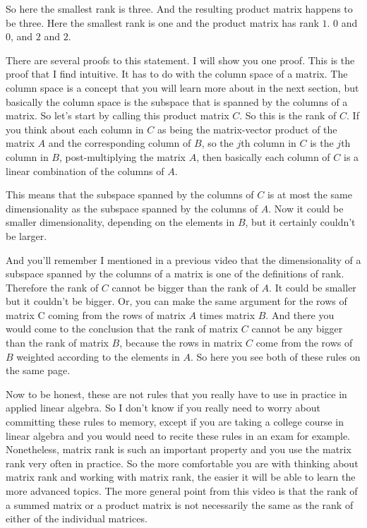 \documentclass[fleqn,10pt]{olplainarticle}
\theoremstyle{definition}
\theoremstyle{remark}
\begin{document}
So here the smallest rank is three. And the resulting product matrix happens to be three. Here the smallest rank is one and the product matrix has rank $1$. $0$ and $0$, and $2$ and $2$.

There are several proofs to this statement. I will show you one proof. This is the proof that I find intuitive. It has to do with the column space of a matrix. The column space is a concept that you will learn more about in the next section, but basically the column space is the subspace that is spanned by the columns of a matrix. So let's start by calling this product matrix $C$. So this is the rank of $C$. If you think about each column in $C$ as being the matrix-vector product of the matrix $A$ and the corresponding column of $B$, so the $j$th column in $C$ is the $j$th column in $B$, post-multiplying the matrix $A$, then basically each column of $C$ is a linear combination of the columns of $A$.

This means that the subspace spanned by the columns of $C$ is at most the same dimensionality as the subspace spanned by the columns of $A$. Now it could be smaller dimensionality, depending on the elements in $B$, but it certainly couldn't be larger.

And you'll remember I mentioned in a previous video that the dimensionality of a subspace spanned by the columns of a matrix is one of the definitions of rank. Therefore the rank of $C$ cannot be bigger than the rank of $A$. It could be smaller but it couldn't be bigger. Or, you can make the same argument for the rows of matrix C coming from the rows of matrix $A$ times matrix $B$. And there you would come to the conclusion that the rank of matrix $C$ cannot be any bigger than the rank of matrix $B$, because the rows in matrix $C$ come from the rows of $B$ weighted according to the elements in $A$. So here you see both of these rules on the same page.

Now to be honest, these are not rules that you really have to use in practice in applied linear algebra. So I don't know if you really need to worry about committing these rules to memory, except if you are taking a college course in linear algebra and you would need to recite these rules in an exam for example. Nonetheless, matrix rank is such an important property and you use the matrix rank very often in practice. So the more comfortable you are with thinking about matrix rank and working with matrix rank, the easier it will be able to learn the more advanced topics. The more general point from this video is that the rank of a summed matrix or a product matrix is not necessarily the same as the rank of either of the individual matrices.
\end{document}
